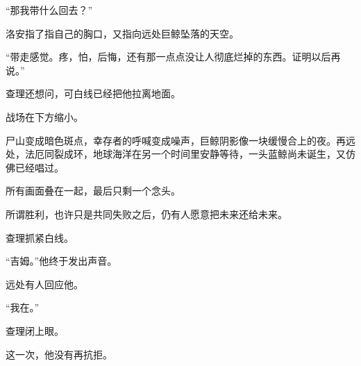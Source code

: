 “那我带什么回去？”

洛安指了指自己的胸口，又指向远处巨鲸坠落的天空。

“带走感觉。疼，怕，后悔，还有那一点点没让人彻底烂掉的东西。证明以后再说。”

查理还想问，可白线已经把他拉离地面。

战场在下方缩小。

尸山变成暗色斑点，幸存者的呼喊变成噪声，巨鲸阴影像一块缓慢合上的夜。再远处，法厄同裂成环，地球海洋在另一个时间里安静等待，一头蓝鲸尚未诞生，又仿佛已经唱过。

所有画面叠在一起，最后只剩一个念头。

所谓胜利，也许只是共同失败之后，仍有人愿意把未来还给未来。

查理抓紧白线。

“吉姆。”他终于发出声音。

远处有人回应他。

“我在。”

查理闭上眼。

这一次，他没有再抗拒。
